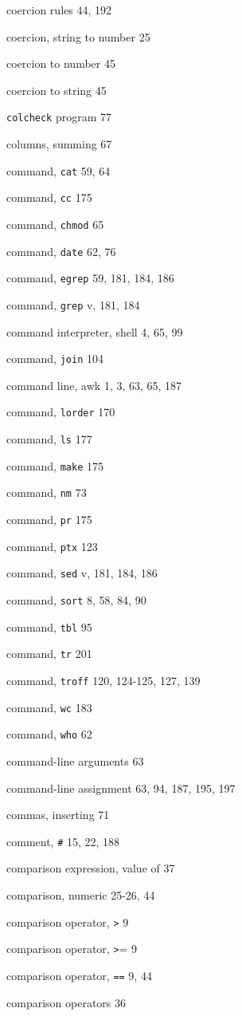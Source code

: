 \begin{multicols}{2}
coercion rules 44, 192

coercion, string to number 25

coercion to number 45

coercion to string 45

\verb'colcheck' program 77

columns, summing 67

command, \verb'cat' 59, 64

command, \verb'cc' 175

command, \verb'chmod' 65

command, \verb'date' 62, 76

command, \verb'egrep' 59, 181, 184, 186

command, \verb'grep' v, 181, 184

command interpreter, shell 4, 65, 99

command, \verb'join' 104

command line, awk 1, 3, 63, 65, 187

command, \verb'lorder' 170

command, \verb'ls' 177

command, \verb'make' 175

command, \verb'nm' 73

command, \verb'pr' 175

command, \verb'ptx' 123

command, \verb'sed' v, 181, 184, 186

command, \verb'sort' 8, 58, 84, 90

command, \verb'tbl' 95

command, \verb'tr' 201

command, \verb'troff' 120, 124-125, 127, 139

command, \verb'wc' 183

command, \verb'who' 62

command-line arguments 63

command-line assignment 63, 94, 187, 195, 197

commas, inserting 71

comment, \verb'#' 15, 22, 188

comparison expression, value of 37

comparison, numeric 25-26, 44

comparison operator, \verb'>' 9

comparison operator, \verb'>'= 9

comparison operator, \verb'==' 9, 44

comparison operators 36


\end{multicols}
